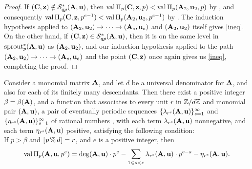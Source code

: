 \documentclass{amsart}
\begin{document}
\begin{proof}
   If $(\mathbf{C},\mathbf{z}) \notin \mathcal{S}^{\ast}_{qp}(\mathbf{A},\mathbf{u})$, then $\operatorname{val} \Pi_p(\mathbf{C},\mathbf{z}, p)< \operatorname{val} \Pi_p(\mathbf{A}_2, \mathbf{u}_2, p)$ by , and consequently $\operatorname{val} \Pi_p(\mathbf{C}, \mathbf{z},p^{e-1}) < \operatorname{val}\Pi_p(\mathbf{A}_2,\mathbf{u}_2, p^{e-1})$ by .
   The induction hypothesis applied to $(\mathbf{A}_2, \mathbf{u}_2) \to \cdots \to (\mathbf{A}_e, \mathbf{u}_e)$ and $(\mathbf{A}_2,\mathbf{u}_2)$ itself gives \eqref{ineq}.
   On the other hand, if $(\mathbf{C}, \mathbf{z}) \in \mathcal{S}^{\ast}_{qp}(\mathbf{A},\mathbf{u})$, then it is on the same level in $\operatorname{sprout}_p^{\ast}(\mathbf{A},\mathbf{u})$ as $(\mathbf{A}_2, \mathbf{u}_2)$, and  our induction hypothesis applied to the path $(\mathbf{A}_2, \mathbf{u}_2) \to \cdots \to (\mathbf{A}_e, \mathbf{u}_e)$ and the point $(\mathbf{C}, \mathbf{z})$ once again gives us \eqref{ineq}, completing the proof.
\end{proof}

\begin{theorem}
   \label{main theorem wrt diagonal: T}
   Consider a monomial matrix $\mathbf{A}$, and let $d$ be a universal denominator for $\mathbf{A}$, and also for each of its finitely many descendants.  Then there exist a positive integer $\beta = \beta(\mathbf{A})$, and a function that associates to every unit $r$ in $\mathbb{Z}/d\mathbb{Z}$ and monomial pair $(\mathbf{A}, \mathbf{u})$, a pair of eventually periodic sequences $\{ \lambda_{r^s}(\mathbf{A}, \mathbf{u})\}_{s=1}^{\infty}$  and $\{ \eta_{r^s}(\mathbf{A}, \mathbf{u}) \}_{s=1}^{\infty}$ of rational numbers%
   , with each term $\lambda_{r^s}(\mathbf{A}, \mathbf{u})$  nonnegative, and each term $\eta_{r^s}(\mathbf{A}, \mathbf{u})$  positive, satisfying the following condition:  \\ If $p > \beta$ and $[ \hspace{.01in} p \, \% \, d \hspace{.01in} ] = r$, and $e$ is a positive integer, then
%
\[
 \operatorname{val} \Pi_p(\mathbf{A},\mathbf{u}, p^e) =  \deg(\mathbf{A},\mathbf{u}) \cdot p^e - \sum_{1 \leqslant s < e} \lambda_{r^s}(\mathbf{A}, \mathbf{u}) \cdot  p^{e-s} - \eta_{r^e}(\mathbf{A},\mathbf{u}).
   \]%
 

%
\end{theorem}
\end{document}
